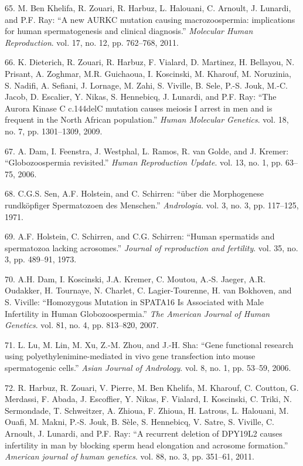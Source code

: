 \documentclass[12pt,twoside]{ugathesis}
\theoremstyle{definition}
\theoremstyle{definition}
\theoremstyle{remark}
\begin{document}
\hypertarget{ref-BenKhelifa2011}{}
65. M. Ben Khelifa, R. Zouari, R. Harbuz, L. Halouani, C. Arnoult, J.
Lunardi, and P.F. Ray: ``A new AURKC mutation causing macrozoospermia:
implications for human spermatogenesis and clinical diagnosis.''
\emph{Molecular Human Reproduction}. vol. 17, no. 12, pp. 762--768,
2011.

\hypertarget{ref-Dieterich2009}{}
66. K. Dieterich, R. Zouari, R. Harbuz, F. Vialard, D. Martinez, H.
Bellayou, N. Prisant, A. Zoghmar, M.R. Guichaoua, I. Koscinski, M.
Kharouf, M. Noruzinia, S. Nadifi, A. Sefiani, J. Lornage, M. Zahi, S.
Viville, B. Sele, P.-S. Jouk, M.-C. Jacob, D. Escalier, Y. Nikas, S.
Hennebicq, J. Lunardi, and P.F. Ray: ``The Aurora Kinase C c.144delC
mutation causes meiosis I arrest in men and is frequent in the North
African population.'' \emph{Human Molecular Genetics}. vol. 18, no. 7,
pp. 1301--1309, 2009.

\hypertarget{ref-Dam2006}{}
67. A. Dam, I. Feenstra, J. Westphal, L. Ramos, R. van Golde, and J.
Kremer: ``Globozoospermia revisited.'' \emph{Human Reproduction Update}.
vol. 13, no. 1, pp. 63--75, 2006.

\hypertarget{ref-Sen2009}{}
68. C.G.S. Sen, A.F. Holstein, and C. Schirren: ``über die Morphogenese
rundköpfiger Spermatozoen des Menschen.'' \emph{Andrologia}. vol. 3, no.
3, pp. 117--125, 1971.

\hypertarget{ref-Holstein1973}{}
69. A.F. Holstein, C. Schirren, and C.G. Schirren: ``Human spermatids
and spermatozoa lacking acrosomes.'' \emph{Journal of reproduction and
fertility}. vol. 35, no. 3, pp. 489--91, 1973.

\hypertarget{ref-Dam2007a}{}
70. A.H. Dam, I. Koscinski, J.A. Kremer, C. Moutou, A.-S. Jaeger, A.R.
Oudakker, H. Tournaye, N. Charlet, C. Lagier-Tourenne, H. van Bokhoven,
and S. Viville: ``Homozygous Mutation in SPATA16 Is Associated with Male
Infertility in Human Globozoospermia.'' \emph{The American Journal of
Human Genetics}. vol. 81, no. 4, pp. 813--820, 2007.

\hypertarget{ref-Lu2006}{}
71. L. Lu, M. Lin, M. Xu, Z.-M. Zhou, and J.-H. Sha: ``Gene functional
research using polyethylenimine-mediated in vivo gene transfection into
mouse spermatogenic cells.'' \emph{Asian Journal of Andrology}. vol. 8,
no. 1, pp. 53--59, 2006.

\hypertarget{ref-Harbuz2011}{}
72. R. Harbuz, R. Zouari, V. Pierre, M. Ben Khelifa, M. Kharouf, C.
Coutton, G. Merdassi, F. Abada, J. Escoffier, Y. Nikas, F. Vialard, I.
Koscinski, C. Triki, N. Sermondade, T. Schweitzer, A. Zhioua, F. Zhioua,
H. Latrous, L. Halouani, M. Ouafi, M. Makni, P.-S. Jouk, B. Sèle, S.
Hennebicq, V. Satre, S. Viville, C. Arnoult, J. Lunardi, and P.F. Ray:
``A recurrent deletion of DPY19L2 causes infertility in man by blocking
sperm head elongation and acrosome formation.'' \emph{American journal
of human genetics}. vol. 88, no. 3, pp. 351--61, 2011.
\end{document}
